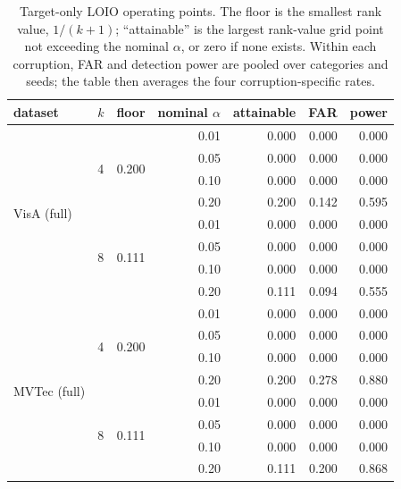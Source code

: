 \begin{table}[pos=t]
\centering
\caption{Target-only LOIO operating points. The floor is the smallest rank value, $1/(k{+}1)$; ``attainable'' is the largest rank-value grid point not exceeding the nominal $\alpha$, or zero if none exists. Within each corruption, FAR and detection power are pooled over categories and seeds; the table then averages the four corruption-specific rates.}
\label{tab:attainable-alpha}
\footnotesize
\setlength{\tabcolsep}{3pt}
\begin{tabular}{llrrrrr}
\toprule
dataset & $k$ & floor & nominal $\alpha$ & attainable & FAR & power \\
\midrule
\multirow{8}{*}{VisA (full)} & \multirow{4}{*}{4} & \multirow{4}{*}{0.200} & 0.01 & 0.000 & 0.000 & 0.000 \\
 & & & 0.05 & 0.000 & 0.000 & 0.000 \\
 & & & 0.10 & 0.000 & 0.000 & 0.000 \\
 & & & 0.20 & 0.200 & 0.142 & 0.595 \\
\cmidrule(lr){2-7}
 & \multirow{4}{*}{8} & \multirow{4}{*}{0.111} & 0.01 & 0.000 & 0.000 & 0.000 \\
 & & & 0.05 & 0.000 & 0.000 & 0.000 \\
 & & & 0.10 & 0.000 & 0.000 & 0.000 \\
 & & & 0.20 & 0.111 & 0.094 & 0.555 \\
\midrule
\multirow{8}{*}{MVTec (full)} & \multirow{4}{*}{4} & \multirow{4}{*}{0.200} & 0.01 & 0.000 & 0.000 & 0.000 \\
 & & & 0.05 & 0.000 & 0.000 & 0.000 \\
 & & & 0.10 & 0.000 & 0.000 & 0.000 \\
 & & & 0.20 & 0.200 & 0.278 & 0.880 \\
\cmidrule(lr){2-7}
 & \multirow{4}{*}{8} & \multirow{4}{*}{0.111} & 0.01 & 0.000 & 0.000 & 0.000 \\
 & & & 0.05 & 0.000 & 0.000 & 0.000 \\
 & & & 0.10 & 0.000 & 0.000 & 0.000 \\
 & & & 0.20 & 0.111 & 0.200 & 0.868 \\
\bottomrule
\end{tabular}
\end{table}
